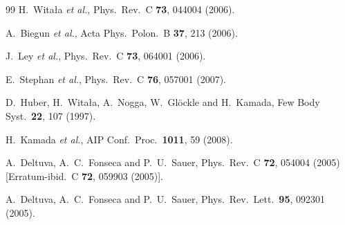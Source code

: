 \documentclass[aps,rmp,nofootinbib,twocolumn,floatfix]{revtex4}
\begin{document}
\begin{thebibliography}{99}
  H.~Wita{\l}a {\it et al.},
  Phys.\ Rev.\  C {\bf 73}, 044004 (2006).

  A.~Biegun {\it et al.},
  Acta Phys.\ Polon.\  B {\bf 37}, 213 (2006).

  J.~Ley {\it et al.},
  Phys.\ Rev.\  C {\bf 73}, 064001 (2006).

  E.~Stephan {\it et al.},
  Phys.\ Rev.\  C {\bf 76}, 057001 (2007).

  D.~Huber, H.~Wita{\l}a, A.~Nogga, W.~Gl\"ockle and H.~Kamada,
  Few Body Syst.\  {\bf 22}, 107 (1997).


  H.~Kamada {\it et al.},
  AIP Conf.\ Proc.\  {\bf 1011}, 59 (2008).


  A.~Deltuva, A.~C.~Fonseca and P.~U.~Sauer,
  Phys.\ Rev.\  C {\bf 72}, 054004 (2005)
  [Erratum-ibid.\  C {\bf 72}, 059903 (2005)].

  A.~Deltuva, A.~C.~Fonseca and P.~U.~Sauer,
  Phys.\ Rev.\ Lett.\  {\bf 95}, 092301 (2005).


\end{thebibliography}
\end{document}
